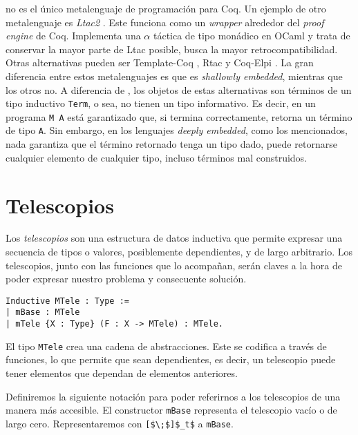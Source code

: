 \Mtac no es el único metalenguaje de programación para Coq. 
Un ejemplo de otro metalenguaje es \emph{Ltac2} \cite{Ltac2}.
Este funciona como un \emph{wrapper} alrededor del \emph{proof engine} de Coq.
Implementa una $\alpha$ táctica de tipo monádico en OCaml y trata de conservar la mayor parte de Ltac posible, busca la mayor retrocompatibilidad.
Otras alternativas pueden ser Template-Coq \cite{DBLP:conf/itp/AnandBCST18}, Rtac \cite{DBLP:conf/esop/MalechaB16} y Coq-Elpi \cite{tassi:hal-01637063}.
La gran diferencia entre estos metalenguajes es que \Mtac es \emph{shallowly embedded}, mientras que los otros no. A diferencia de \Mtac, los objetos de estas alternativas son términos de un tipo inductivo \lstinline{Term}, o sea, no tienen un tipo informativo. Es decir, en \Mtac un programa \lstinline{M A} está garantizado que, si termina correctamente, retorna un término de tipo \lstinline{A}. Sin embargo, en los lenguajes \emph{deeply embedded}, como los mencionados, nada garantiza que el término retornado tenga un tipo dado, puede retornarse cualquier elemento de cualquier tipo, incluso términos mal construidos.

\section{Telescopios}

Los \emph{telescopios} son una estructura de datos inductiva %
que permite expresar una secuencia de tipos o valores, posiblemente dependientes, y de largo arbitrario.
Los telescopios, junto con las funciones que lo acompañan, serán claves a la hora de poder expresar nuestro problema y consecuente solución.

\begin{lstlisting}[float=h,frame=tb,caption={Definición de telescopio},label=lst:MTele]
Inductive MTele : Type :=
| mBase : MTele
| mTele {X : Type} (F : X -> MTele) : MTele.
\end{lstlisting}

El tipo \lstinline{MTele} crea una cadena de abstracciones.
Este se codifica a través de funciones, lo que permite que sean dependientes, es decir, un telescopio puede tener elementos que dependan de elementos anteriores.

Definiremos la siguiente notación para poder referirnos a los telescopios de una manera más accesible.
El constructor \lstinline{mBase} representa el telescopio vacío o de largo cero. Representaremos con \lstinline{[$\;$]$_t$} a \lstinline{mBase}.

